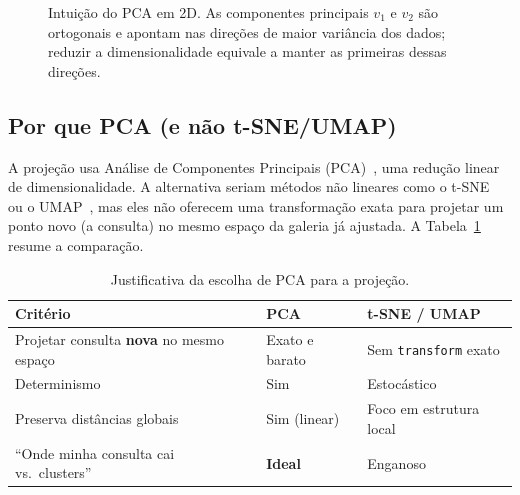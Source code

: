 \documentclass[10pt]{article}
\begin{document}
\begin{figure}[H]
  \centering
  \caption{Intuição do PCA em 2D. As componentes principais $v_1$ e $v_2$ são
  ortogonais e apontam nas direções de maior variância dos dados; reduzir a
  dimensionalidade equivale a manter as primeiras dessas direções.}
  \label{fig:pca}
\end{figure}

\subsection{Por que PCA (e não t-SNE/UMAP)}

A projeção usa Análise de Componentes Principais
(PCA)~\cite{jolliffe2002pca}, uma redução linear de dimensionalidade. A
alternativa seriam métodos não lineares como o t-SNE~\cite{vandermaaten2008tsne}
ou o UMAP~\cite{mcinnes2018umap}, mas eles não oferecem uma transformação exata
para projetar um ponto novo (a consulta) no mesmo espaço da galeria já ajustada.
A Tabela~\ref{tab:pca} resume a comparação.

\begin{table}[H]
\centering
\begin{tabular}{@{}p{6.5cm}p{3.5cm}p{4cm}@{}}
\toprule
\textbf{Critério} & \textbf{PCA} & \textbf{t-SNE / UMAP} \\
\midrule
Projetar consulta \textbf{nova} no mesmo espaço & Exato e barato & Sem \texttt{transform} exato \\
Determinismo & Sim & Estocástico \\
Preserva distâncias globais & Sim (linear) & Foco em estrutura local \\
``Onde minha consulta cai vs.\ clusters'' & \textbf{Ideal} & Enganoso \\
\bottomrule
\end{tabular}
\caption{Justificativa da escolha de PCA para a projeção.}
\label{tab:pca}
\end{table}
\end{document}
